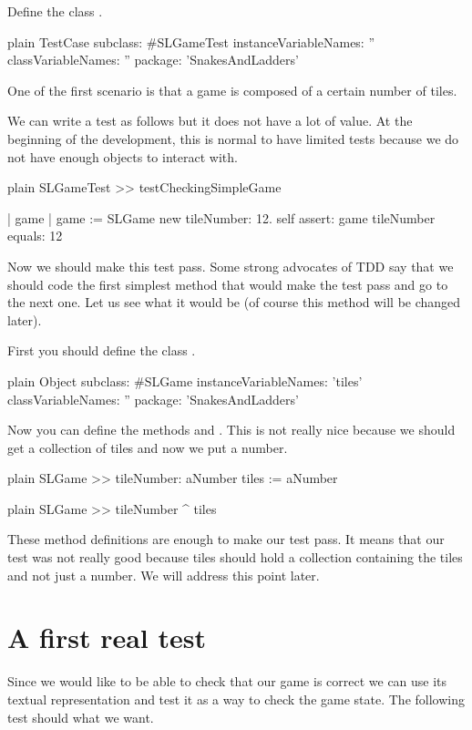 \documentclass[10pt,twoside,english]{_support/latex/sbabook/sbabook}
\begin{document}
Define the class .

\begin{displaycode}{plain}
TestCase subclass: #SLGameTest
	instanceVariableNames: ''
	classVariableNames: ''
	package: 'SnakesAndLadders'
\end{displaycode}

One of the first scenario is that a game is composed of a certain number of tiles. 

We can write a test as follows but it does not have a lot of value. At the beginning of the development, this is normal to have limited tests because we do not have enough objects to interact with. 

\begin{displaycode}{plain}
SLGameTest >> testCheckingSimpleGame

	| game |
	game := SLGame new tileNumber: 12.
	self assert: game tileNumber equals: 12
\end{displaycode}

Now we should make this test pass. Some strong advocates of TDD say that we should code 
the first simplest method that would make the test pass and go to the next one. 
Let us see what it would be (of course this method will be changed later).

First you should define the class .

\begin{displaycode}{plain}
Object subclass: #SLGame
	instanceVariableNames: 'tiles'
	classVariableNames: ''
	package: 'SnakesAndLadders'
\end{displaycode}

Now you can define the methods  and . This is not really nice because we should get a collection of tiles and now we put a number.

\begin{displaycode}{plain}
SLGame >> tileNumber: aNumber
	tiles := aNumber
\end{displaycode}

\begin{displaycode}{plain}
SLGame >> tileNumber
	^ tiles
\end{displaycode}

These method definitions are enough to make our test pass. It means that our test was not really good because tiles should hold a collection containing the tiles and not just a number. We will address this point later.
\section{A first real test}
Since we would like to be able to check that our game is correct we can use its textual representation and test it as a way to check the game state. 
The following test should what we want. 
\end{document}
